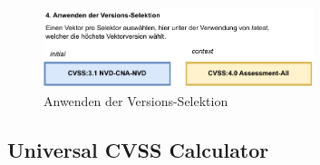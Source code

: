 \begin{figure}[htbp] %
    \centering
    \includegraphics[width=0.7\textwidth, keepaspectratio]{res/grafiken/cvss-selection-process-selection-4}
    \caption{Anwenden der Versions-Selektion}
    \label{fig:cvss-selection-process-selection-4}
\end{figure}

\subsection{Universal CVSS Calculator} \label{subsec:projektbericht-loesungsweg-typescript-cvss-online-calculator}
